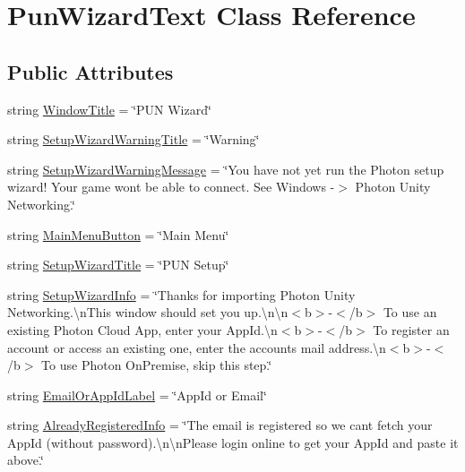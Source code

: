 \hypertarget{class_pun_wizard_text}{}\section{Pun\+Wizard\+Text Class Reference}
\label{class_pun_wizard_text}
\subsection*{Public Attributes}
\begin{DoxyCompactItemize}
\item 
string \hyperlink{class_pun_wizard_text_aa2243e01e25e6c918919d3a493c0ea57}{Window\+Title} = \char`\"{}P\+UN Wizard\char`\"{}
\item 
string \hyperlink{class_pun_wizard_text_ab212b87edb1bf02b98e1ad7e5331b2a4}{Setup\+Wizard\+Warning\+Title} = \char`\"{}Warning\char`\"{}
\item 
string \hyperlink{class_pun_wizard_text_a35b799fca80324591711e773435a1837}{Setup\+Wizard\+Warning\+Message} = \char`\"{}You have not yet run the Photon setup wizard! Your game won\textquotesingle{}t be able to connect. See Windows -\/$>$ Photon Unity Networking.\char`\"{}
\item 
string \hyperlink{class_pun_wizard_text_a090688891cabaa9dac36c28a9902ad20}{Main\+Menu\+Button} = \char`\"{}Main Menu\char`\"{}
\item 
string \hyperlink{class_pun_wizard_text_a22ff0b63d4b3aa7c5502863e6ad2e675}{Setup\+Wizard\+Title} = \char`\"{}P\+UN Setup\char`\"{}
\item 
string \hyperlink{class_pun_wizard_text_a503b62f5d16e879aeb94d23cfc37a9cb}{Setup\+Wizard\+Info} = \char`\"{}Thanks for importing Photon Unity Networking.\textbackslash{}n\+This window should set you up.\textbackslash{}n\textbackslash{}n$<$b$>$-\/$<$/b$>$ To use an existing Photon Cloud App, enter your App\+Id.\textbackslash{}n$<$b$>$-\/$<$/b$>$ To register an account or access an existing one, enter the account\textquotesingle{}s mail address.\textbackslash{}n$<$b$>$-\/$<$/b$>$ To use Photon On\+Premise, skip this step.\char`\"{}
\item 
string \hyperlink{class_pun_wizard_text_a9f3b6fe2361497a670199d682e99575b}{Email\+Or\+App\+Id\+Label} = \char`\"{}App\+Id or Email\char`\"{}
\item 
string \hyperlink{class_pun_wizard_text_a996ee166945229246f0165013bdf8315}{Already\+Registered\+Info} = \char`\"{}The email is registered so we can\textquotesingle{}t fetch your App\+Id (without password).\textbackslash{}n\textbackslash{}n\+Please login online to get your App\+Id and paste it above.\char`\"{}

\end{DoxyCompactItemize}
